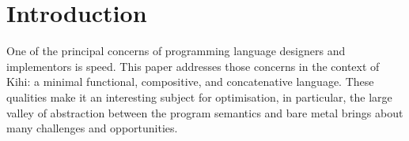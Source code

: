\chapter{Introduction} \label{C:intro}
One of the principal concerns of programming language designers
and implementors is speed. This paper addresses those concerns
in the context of Kihi: a minimal functional, compositive,
and concatenative language. These qualities make it an 
interesting subject for optimisation, in particular, the large
valley of abstraction between the program semantics and bare
metal brings about many challenges and opportunities.



